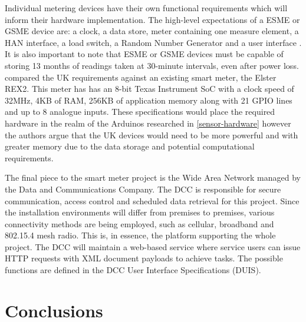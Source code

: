       Individual metering devices have their own functional requirements which will inform their hardware implementation. The high-level expectations of a ESME or GSME device are: a clock, a data store, meter containing one measure element, a HAN interface, a load switch, a Random Number Generator and a user interface \citep{smets:2014}. It is also important to note that ESME or GSME devices must be capable of storing 13 months of readings taken at 30-minute intervals, even after power loss. \citet{SMUK:2012} compared the UK requirements against an existing smart meter, the Elster REX2. This meter has has an 8-bit Texas Instrument SoC with a clock speed of 32MHz, 4KB of RAM, 256KB of application memory along with 21 GPIO lines and up to 8 analogue inputs. These specifications would place the required hardware in the realm of the Arduinos researched in \ref{sensor-hardware} however the authors argue that the UK devices would need to be more powerful and with greater memory due to the data storage and potential computational requirements.

      The final piece to the smart meter project is the Wide Area Network managed by the Data and Communications Company. The DCC is responsible for secure communication, access control and scheduled data retrieval for this project. Since the installation environments will differ from premises to premises, various connectivity methods are being employed, such as cellular, broadband and 802.15.4 mesh radio. This is, in essence, the platform supporting the whole project. The DCC will maintain a web-based service where service users can issue HTTP requests with XML document payloads to achieve tasks. The possible functions are defined in the DCC User Interface Specifications (DUIS).

  \section{Conclusions}